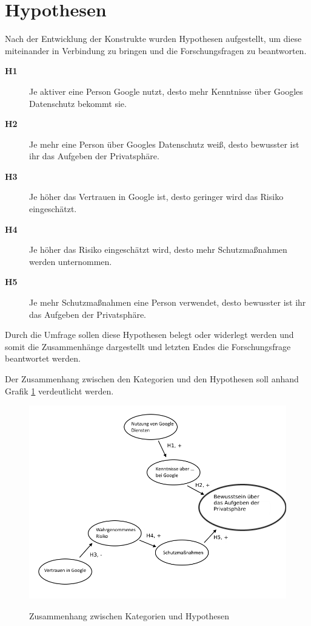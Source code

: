 \section{Hypothesen}
Nach der Entwicklung der Konstrukte wurden Hypothesen aufgestellt, um diese miteinander in Verbindung zu bringen und die Forschungsfragen zu beantworten.
\begin{description}
\item[\label{itm:H0}\textbf{H1}]Je aktiver eine Person Google nutzt, desto mehr Kenntnisse über Googles Datenschutz bekommt sie.
\item[\label{itm:H1}\textbf{H2}]Je mehr eine Person über Googles Datenschutz weiß, desto bewusster ist ihr das Aufgeben der Privatsphäre.
\item[\label{itm:H2}\textbf{H3}]Je höher das Vertrauen in Google ist, desto geringer wird das Risiko eingeschätzt.
\item[\label{itm:H3}\textbf{H4}]Je höher das Risiko eingeschätzt wird, desto mehr Schutzmaßnahmen werden unternommen.
\item[\label{itm:H4}\textbf{H5}]Je mehr Schutzmaßnahmen eine Person verwendet, desto bewusster ist ihr das Aufgeben der Privatsphäre.
\end{description}

Durch die Umfrage sollen diese Hypothesen belegt oder widerlegt werden und somit die Zusammenhänge dargestellt und letzten Endes die Forschungsfrage beantwortet werden.

Der Zusammenhang zwischen den Kategorien und den Hypothesen soll anhand Grafik \ref{bubbles} verdeutlicht werden.
\begin{figure}[H]
\centering
\includegraphics[scale=0.55]{images/bubbles}\\
\caption{Zusammenhang zwischen Kategorien und Hypothesen}\label{bubbles}
\end{figure}

